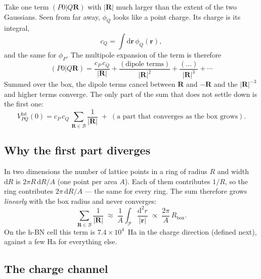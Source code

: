 \documentclass[11pt,a4paper]{article}
\newcommand{\br}{\mathbf{r}}
\newcommand{\bR}{\mathbf{R}}
\newcommand{\dd}{\mathrm{d}}
\newcommand{\lat}{\mathrm{lat}}
\begin{document}
Take one term $(P0|Q\bR)$ with $|\bR|$ much larger than the extent of the two Gaussians.
Seen from far away, $\phi_Q$ looks like a point charge. Its charge is its integral,
\begin{equation}
  c_Q = \int\dd\br\,\phi_Q(\br),
  \label{eq:charge}
\end{equation}
and the same for $\phi_P$. The multipole expansion of the term is therefore
\begin{equation}
  (P0|Q\bR) = \frac{c_P\,c_Q}{|\bR|} + \frac{(\text{dipole terms})}{|\bR|^2} + \frac{(\ldots)}{|\bR|^3} + \cdots
  \label{eq:multipole}
\end{equation}
Summed over the box, the dipole terms cancel between $\bR$ and $-\bR$ and the $|\bR|^{-3}$ and
higher terms converge. The only part of the sum that does not settle down is the first one:
\begin{equation}
  V^\lat_{PQ}(0) = c_P\,c_Q\,\sum_{\bR\in\mathcal B}\frac{1}{|\bR|}
  \;+\;(\text{a part that converges as the box grows}).
  \label{eq:split}
\end{equation}

\subsection{Why the first part diverges}

In two dimensions the number of lattice points in a ring of radius $R$ and width $\dd R$ is
$2\pi R\,\dd R/A$ (one point per area $A$). Each of them contributes $1/R$, so the ring
contributes $2\pi\,\dd R/A$ --- the same for every ring. The sum therefore grows
\emph{linearly} with the box radius and never converges:
\begin{equation}
  \sum_{\bR\in\mathcal B}\frac{1}{|\bR|}\;\approx\;\frac{1}{A}\int_{\mathcal P}\frac{\dd^2 r}{|\br|}
  \;\propto\;\frac{2\pi}{A}\,R_\mathrm{box}.
\end{equation}
On the h-BN cell this term is $7.4\times10^{4}$~Ha in the charge direction (defined next),
against a few Ha for everything else.

\subsection{The charge channel}
\end{document}
